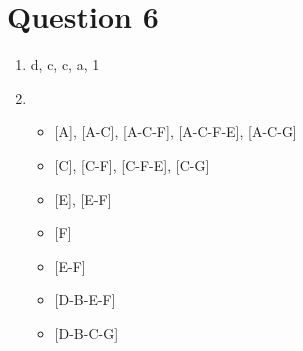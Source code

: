 \documentclass{article}
\begin{document}
\section*{Question 6}
\begin{enumerate}[label=\roman*)]
  \item d, c, c, a, 1
  \item
    \begin{itemize}
      \item {[A], [A-C], [A-C-F], [A-C-F-E], [A-C-G]}
      \item {[C], [C-F], [C-F-E], [C-G]}
      \item {[E], [E-F]}
      \item {[F]}
      \item {[E-F]}
      \item {[D-B-E-F]}
      \item {[D-B-C-G]}
    \end{itemize}
\end{enumerate}
\end{document}

